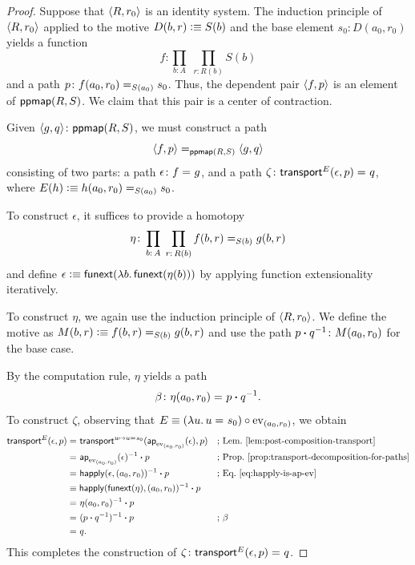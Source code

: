 \begin{proof}
    Suppose that $\langle R,r_0\rangle$ is an identity system. The induction principle of $\langle R,r_0\rangle$ applied to the motive $D(b,r)\mathrel{\vcentcolon}\equiv S(b)$ and the base element $s_0\colon D(a_0,r_0)$ yields a function
    \[
        f\colon\prod_{b\colon A}\;
            \prod_{r\colon R(b)}S(b)
    \]
    and a path $p\colon f(a_0,r_0)\eq{S(a_0)}s_0$. Thus, the dependent pair $\langle f,p\rangle$ is an element of $\mathsf{ppmap}(R,S)$. We claim that this pair is a center of contraction.
    
    Given $\dep{g,q}\colon\fun{ppmap}(R,S)$, we must construct a path
    \[
        \langle f,p\rangle\mathrel{=_{\mathsf{ppmap}(R,S)}}\langle g,q\rangle
    \]
    consisting of two parts: a path $\epsilon\colon f\eq{}g$, and a path $\zeta\colon\fun{transport}^E(\epsilon,p)\eq{}q$, where $E(h)\mathrel{\vcentcolon}\equiv h(a_0,r_0)\mathrel{=_{S(a_0)}}s_0$.

    To construct $\epsilon$, it suffices to provide a homotopy
    \[
        \eta\colon
            \prod_{b\colon A}\;
            \prod_{r\colon R(b)}
                f(b,r)\eq{S(b)}g(b,r)
    \]
    and define\/ $\epsilon\mathrel{\vcentcolon}\equiv\mathsf{funext}(\lambda b.\,\mathsf{funext}(\eta(b)))$ by applying function extensionality iteratively.

    To construct $\eta$, we again use the induction principle of $\langle R,r_0\rangle$. We define the motive as $M(b,r)\mathrel{\vcentcolon}\equiv f(b,r)\mathrel{=_{S(b)}}g(b,r)$ and use the path $p\ct q^{-1}\colon M(a_0,r_0)$ for the base case.

    By the computation rule, $\eta$ yields a path
    \[
        \beta\colon\eta(a_0,r_0)\eq{}p\ct q^{-1}.
    \]
    To construct $\zeta$, observing that $E\equiv(\lambda u.\,u\mathrel{=_{}}s_0)\circ{\operatorname{ev}}_{(a_0,r_0)}$, we obtain
    \begin{align*}
        \mathsf{transport}^E(\epsilon,p)
            &\mathrel{=_{}}\mathsf{transport}^{u\mapsto u\mathrel{=_{}}s_0}(
                \mathsf{ap}_{{\operatorname{ev}}_{(a_0,r_0)}}(\epsilon),p
                )
                &&\text{; Lem.~\ref{lem:post-composition-transport}}\\
            &\mathrel{=_{}}\mathsf{ap}_{{\operatorname{ev}}_{(a_0,r_0)}}(\epsilon)^{-1}\mathbin{\boldsymbol{\cdot}} p
                &&\text{; Prop.~\ref{prop:transport-decomposition-for-paths}}\\
            &\mathrel{=_{}}\mathsf{happly}(\epsilon,(a_0,r_0))^{-1}\mathbin{\boldsymbol{\cdot}} p
                &&\text{; Eq.~\ref{eq:happly-is-ap-ev}}\\
            &\equiv\mathsf{happly}(\mathsf{funext}(\eta),(a_0,r_0))^{-1}\mathbin{\boldsymbol{\cdot}} p\\
            &\mathrel{=_{}}\eta(a_0,r_0)^{-1}\mathbin{\boldsymbol{\cdot}} p\\
            &\mathrel{=_{}}(p\mathbin{\boldsymbol{\cdot}} q^{-1})^{-1}\mathbin{\boldsymbol{\cdot}} p
                &&\text{; }\beta\\
            &\mathrel{=_{}}q.
    \end{align*}
    This completes the construction of $\zeta\colon\fun{transport}^E(\epsilon,p)\eq{}q$.


\end{proof}
